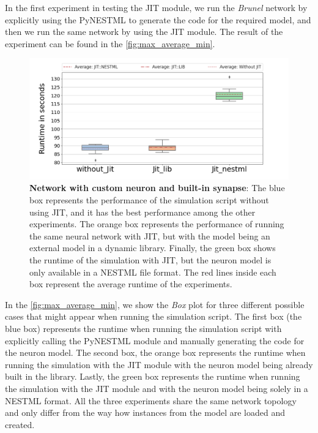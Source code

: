 In the first experiment in testing the JIT module, we run the \emph{Brunel} network by explicitly using the PyNESTML to generate the code for the required model, and then we run the same network by using the JIT module. The result of the experiment can be found in the \autoref{fig:max_average_min}.

\begin{figure}[ht!]
    \centering
    \includegraphics[width=\textwidth]{src/pic/box_plot_three.png}
    \caption{\textbf{Network with custom neuron and built-in synapse}: The blue box represents the performance of the simulation script without using JIT, and it has the best performance among the other experiments. The orange box represents the performance of running the same neural network with JIT, but with the model being an external model in a dynamic library. Finally, the green box shows the runtime of the simulation with JIT, but the neuron model is only available in a NESTML file format. The red lines inside each box represent the average runtime of the experiments.}
    \label{fig:max_average_min}
\end{figure}

In the \autoref{fig:max_average_min}, we show the \emph{Box} plot for three different possible cases that might appear when running the simulation script. The first box (the blue box) represents the runtime when running the simulation script with explicitly calling the PyNESTML module and manually generating the code for the neuron model. The second box, the orange box represents the runtime when running the simulation with the JIT module with the neuron model being already built in the library. Lastly, the green box represents the runtime when running the simulation with the JIT module and with the neuron model being solely in a NESTML format. All the three experiments share the same network topology and only differ from the way how instances from the model are loaded and created.

